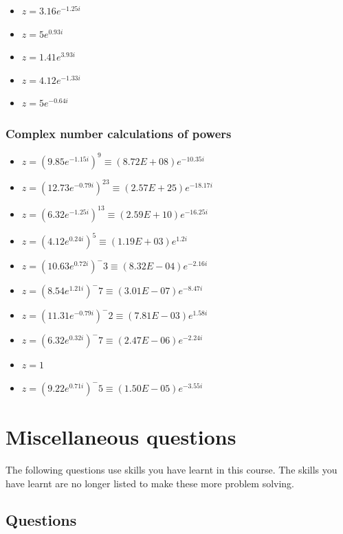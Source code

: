 \documentclass[
]{book}
\providecommand{\tightlist}{%
  \setlength{\itemsep}{0pt}\setlength{\parskip}{0pt}}
\begin{document}
\begin{itemize}
\tightlist
\item
  \(z = 3.16e^{-1.25i}\)
\item
  \(z = 5e^{0.93i}\)
\item
  \(z = 1.41e^{3.93i}\)
\item
  \(z = 4.12e^{-1.33i}\)
\item
  \(z = 5e^{-0.64i}\)
\end{itemize}

\hypertarget{complex-number-calculations-of-powers-1}{%
\subsection{Complex number calculations of powers}\label{complex-number-calculations-of-powers-1}}

\begin{itemize}
\tightlist
\item
  \(z = (9.85e^{-1.15i})^9 \equiv(8.72E+08)e^{-10.35i}\)
\item
  \(z = (12.73e^{-0.79i})^23 \equiv(2.57E+25)e^{-18.17i}\)
\item
  \(z = (6.32e^{-1.25i})^13 \equiv(2.59E+10)e^{-16.25i}\)
\item
  \(z = (4.12e^{0.24i})^5 \equiv(1.19E+03)e^{1.2i}\)
\item
  \(z = (10.63e^{0.72i})^-3 \equiv(8.32E-04)e^{-2.16i}\)
\item
  \(z = (8.54e^{1.21i})^-7 \equiv(3.01E-07)e^{-8.47i}\)
\item
  \(z = (11.31e^{-0.79i})^-2 \equiv(7.81E-03)e^{1.58i}\)
\item
  \(z = (6.32e^{0.32i})^-7 \equiv(2.47E-06)e^{-2.24i}\)
\item
  \(z = 1\)
\item
  \(z = (9.22e^{0.71i})^-5 \equiv(1.50E-05)e^{-3.55i}\)
\end{itemize}

\hypertarget{ch:questions}{%
\chapter{Miscellaneous questions}\label{ch:questions}}

The following questions use skills you have learnt in this course. The skills you have learnt are no longer listed to make these more problem solving.

\hypertarget{questions}{%
\section{Questions}\label{questions}}
\end{document}
